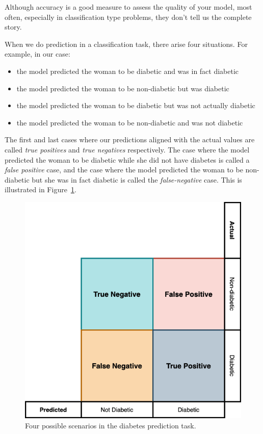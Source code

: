 \documentclass[
  letterpaper,
]{book}
\providecommand{\tightlist}{%
  \setlength{\itemsep}{0pt}\setlength{\parskip}{0pt}}\usepackage{longtable,booktabs,array}
\begin{document}
Although accuracy is a good measure to assess the quality of your model,
most often, especially in classification type problems, they don't tell
us the complete story.

When we do prediction in a classification task, there arise four
situations. For example, in our case:

\begin{itemize}
\tightlist
\item
  the model predicted the woman to be diabetic and was in fact diabetic
\item
  the model predicted the woman to be non-diabetic but was diabetic
\item
  the model predicted the woman to be diabetic but was not actually
  diabetic
\item
  the model predicted the woman to be non-diabetic and was not diabetic
\end{itemize}

The first and last cases where our predictions aligned with the actual
values are called \emph{true positives} and \emph{true negatives}
respectively. The case where the model predicted the woman to be
diabetic while she did not have diabetes is called a \emph{false
positive} case, and the case where the model predicted the woman to be
non-diabetic but she was in fact diabetic is called the
\emph{false-negative} case. This is illustrated in
Figure~\ref{fig-confusion}.

\begin{figure}

{\centering \includegraphics{./images/confusion.png}

}

\caption{\label{fig-confusion}Four possible scenarios in the diabetes
prediction task.}

\end{figure}
\end{document}
